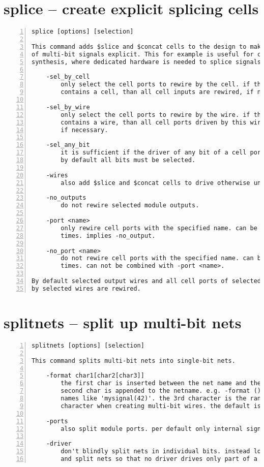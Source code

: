 \section{splice -- create explicit splicing cells}
\label{cmd:splice}
\begin{lstlisting}[numbers=left,frame=single]
    splice [options] [selection]

This command adds $slice and $concat cells to the design to make the splicing
of multi-bit signals explicit. This for example is useful for coarse grain
synthesis, where dedicated hardware is needed to splice signals.

    -sel_by_cell
        only select the cell ports to rewire by the cell. if the selection
        contains a cell, than all cell inputs are rewired, if necessary.

    -sel_by_wire
        only select the cell ports to rewire by the wire. if the selection
        contains a wire, than all cell ports driven by this wire are wired,
        if necessary.

    -sel_any_bit
        it is sufficient if the driver of any bit of a cell port is selected.
        by default all bits must be selected.

    -wires
        also add $slice and $concat cells to drive otherwise unused wires.

    -no_outputs
        do not rewire selected module outputs.

    -port <name>
        only rewire cell ports with the specified name. can be used multiple
        times. implies -no_output.

    -no_port <name>
        do not rewire cell ports with the specified name. can be used multiple
        times. can not be combined with -port <name>.

By default selected output wires and all cell ports of selected cells driven
by selected wires are rewired.
\end{lstlisting}

\section{splitnets -- split up multi-bit nets}
\label{cmd:splitnets}
\begin{lstlisting}[numbers=left,frame=single]
    splitnets [options] [selection]

This command splits multi-bit nets into single-bit nets.

    -format char1[char2[char3]]
        the first char is inserted between the net name and the bit index, the
        second char is appended to the netname. e.g. -format () creates net
        names like 'mysignal(42)'. the 3rd character is the range separation
        character when creating multi-bit wires. the default is '[]:'.

    -ports
        also split module ports. per default only internal signals are split.

    -driver
        don't blindly split nets in individual bits. instead look at the driver
        and split nets so that no driver drives only part of a net.
\end{lstlisting}

